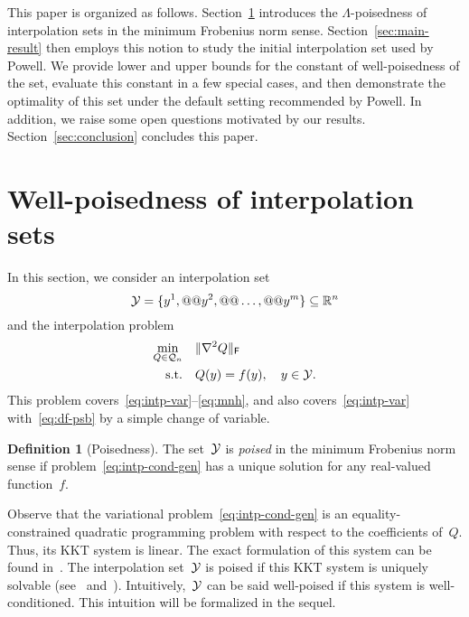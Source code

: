 \documentclass{article}
\makeatletter
\newcounter{cite}
\theoremstyle{definition}
\newtheorem{definition}{Definition}[section]
\theoremstyle{plain}
\theoremstyle{remark}
\newcommand*{\norm}[2][]{#1\lVert#2#1\rVert}
\newcommand*{\set}[2][]{#1\{#2#1\}}
\newcommand*{\obj}{f}
\newcommand*{\R}{\mathbb{R}}
\newcommand*{\xpt}[1][]{\mathcal{Y}\ifblank{#1}{}{^{@#1}}}
\newcommand*{\qpoly}{\mathcal{Q}_n}
\makeatother
\begin{document}
This paper is organized as follows.
Section~\ref{sec:well-poisedness} introduces the $\Lambda$-poisedness of interpolation sets in the minimum Frobenius norm sense.
Section~\ref{sec:main-result} then employs this notion to study the initial interpolation set used by Powell.
We provide lower and upper bounds for the constant of well-poisedness of the set, evaluate this constant in a few special cases, and then demonstrate the optimality of this set under the default setting recommended by Powell.
In addition, we raise some open questions motivated by our results.
Section~\ref{sec:conclusion} concludes this paper.

\section{Well-poisedness of interpolation sets}
\label{sec:well-poisedness}

In this section, we consider an interpolation set
\begin{equation*}
    \xpt = \set{y^1, @@ y^2, @@ \dots, @@ y^m} \subseteq \R^n
\end{equation*}
and the interpolation problem
\begin{equation}
    \label{eq:intp-cond-gen}
    \begin{aligned}
        \min_{Q \in \qpoly} & \quad \norm{\nabla^2 Q}_\textsf{F}\\
        \text{s.t.}         & \quad Q(y) = \obj(y), \quad y \in \xpt.
    \end{aligned}
\end{equation}
This problem covers~\eqref{eq:intp-var}--\eqref{eq:mnh}, and also covers~\eqref{eq:intp-var} with~\eqref{eq:df-psb} by a simple change of variable.

\begin{definition}[Poisedness]
    The set~$\xpt$ is \emph{poised} in the minimum Frobenius norm sense if problem~\eqref{eq:intp-cond-gen} has a unique solution for any real-valued function~$\obj$.
\end{definition}

Observe that the variational problem~\eqref{eq:intp-cond-gen} is an equality-constrained quadratic programming problem with respect to the coefficients of~$Q$.
Thus, its KKT system is linear.
The exact formulation of this system can be found in~\cite{Powell_2004a,Powell_2004b}.
The interpolation set~$\xpt$ is poised if this KKT system is uniquely solvable (see~\cite[\S~2]{Powell_2004a} and~\cite[\S~5.3]{Conn_Scheinberg_Vicente_2009}).
Intuitively,~$\xpt$ can be said well-poised if this system is well-conditioned.
This intuition will be formalized in the sequel.
\end{document}
